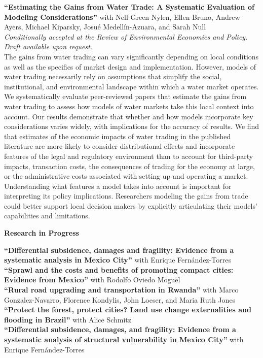 \documentclass[10pt, oneside]{article}
\begin{document}
\begin{minipage}[t]{0.8\linewidth}
\textbf{``Estimating the Gains from Water Trade: A Systematic
Evaluation of Modeling Considerations''} with Nell Green Nylen, Ellen Bruno, Andrew Ayers, Michael Kiparsky, Josué Medellín-Azuara, and Sarah Null \\ 
\emph{Conditionally accepted at the Review of Environmental Economics and Policy. Draft available upon request.} \\

The gains from water trading can vary significantly depending on local conditions as well as the specifics of market design and implementation. However, models of water trading necessarily rely on assumptions that simplify the social, institutional, and environmental landscape within which a water market operates. We systematically evaluate peer-reviewed papers that estimate the gains from water trading to assess how models of water markets  take this local context into account. Our results demonstrate that whether and how models incorporate key considerations varies widely, with implications for the accuracy of results. We find that estimates of the economic impacts of water trading in the published literature are more likely to consider distributional effects and incorporate features of the legal and regulatory environment than to account for third-party impacts, transaction costs, the consequences of trading for the economy at large, or the administrative costs associated with setting up and operating a market. Understanding what features a model takes into account is important for interpreting its policy implications. Researchers modeling the gains from trade could better support local decision makers by explicitly articulating their models’ capabilities and limitations.
\end{minipage}\vspace{5mm}


\begin{minipage}[t]{0.1\linewidth}
\textbf{Research in Progress}
\end{minipage}\hspace{0.05\linewidth}
\begin{minipage}[t]{0.8\linewidth}
\textbf{``Differential subsidence, damages and fragility: Evidence from a systematic analysis in Mexico City''} with Enrique Fernández-Torres\\ 

\textbf{``Sprawl and the costs and benefits of promoting compact cities: Evidence from Mexico''} with Rodolfo Oviedo Moguel \\ 

\textbf{``Rural road upgrading and transportation in Rwanda''} with Marco Gonzalez-Navarro, Florence Kondylis, John Loeser, and Maria Ruth Jones\\ 

\textbf{``Protect the forest, protect cities? Land use change externalities and flooding in Brazil''} with Alice Schmitz\\ 

\textbf{``Differential subsidence, damages, and fragility: Evidence from a systematic analysis of structural vulnerability in Mexico City''} with Enrique Fernández-Torres
\end{minipage}
\end{document}
